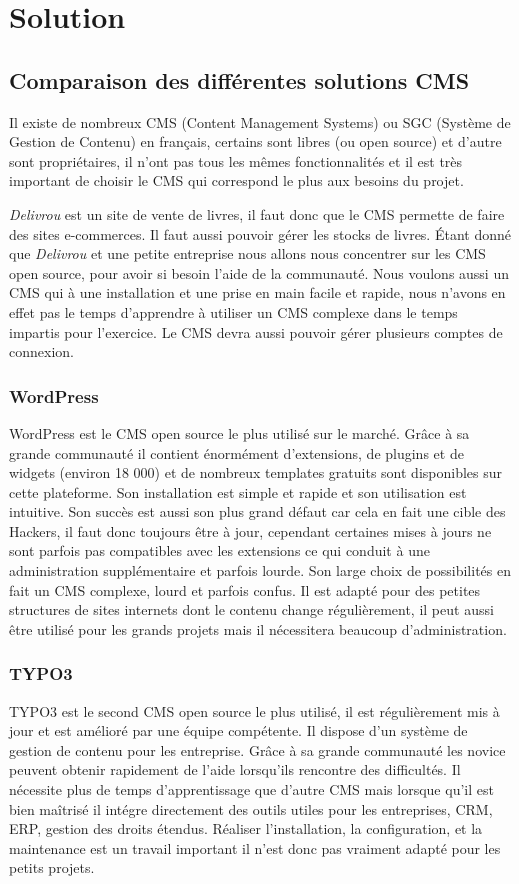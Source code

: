 \documentclass[a4paper,12pt]{report}
\begin{document}
\part{Solution}
\chapter{Comparaison des différentes solutions CMS}
Il existe de nombreux CMS (Content Management Systems) ou SGC (Système
de Gestion de Contenu) en français, certains sont libres (ou open source)
et d'autre sont propriétaires, il n'ont pas tous les mêmes fonctionnalités
et il est très important de choisir le CMS qui correspond le plus aux
besoins du projet.

\textit{Delivrou} est un site de vente de livres, il faut donc que le
CMS permette de faire des sites e-commerces. Il faut aussi pouvoir
gérer les stocks de livres. Étant donné que \textit{Delivrou} et une
petite entreprise nous allons nous concentrer sur les CMS open source,
pour avoir si besoin l'aide de la communauté. Nous voulons aussi un
CMS qui à une installation et une prise en main facile et rapide, nous
n'avons en effet pas le temps d'apprendre à utiliser un CMS complexe
dans le temps impartis pour l'exercice. Le CMS devra aussi pouvoir
gérer plusieurs comptes de connexion.

\section{WordPress}
WordPress est le CMS open source le plus utilisé sur le marché. Grâce
à sa grande communauté il contient énormément d’extensions, de plugins
et de widgets (environ 18 000) et de nombreux templates gratuits sont
disponibles sur cette plateforme. Son installation est simple et
rapide et son utilisation est intuitive.  Son succès est aussi son
plus grand défaut car cela en fait une cible des Hackers, il faut donc
toujours être à jour, cependant certaines mises à jours ne sont
parfois pas compatibles avec les extensions ce qui conduit à une
administration supplémentaire et parfois lourde. Son large choix de
possibilités en fait un CMS complexe, lourd et parfois confus.  Il est
adapté pour des petites structures de sites internets dont le contenu
change régulièrement, il peut aussi être utilisé pour les grands
projets mais il nécessitera beaucoup d'administration.

\section{TYPO3}
TYPO3 est le second CMS open source le plus utilisé, il est
régulièrement mis à jour et est amélioré par une équipe compétente. Il
dispose d'un système de gestion de contenu pour les entreprise.  Grâce
à sa grande communauté les novice peuvent obtenir rapidement de l'aide
lorsqu'ils rencontre des difficultés.  Il nécessite plus de temps
d'apprentissage que d'autre CMS mais lorsque qu'il est bien maîtrisé
il intégre directement des outils utiles pour les entreprises, CRM,
ERP, gestion des droits étendus.  Réaliser l’installation, la
configuration, et la maintenance est un travail important il n'est
donc pas vraiment adapté pour les petits projets.
\end{document}
